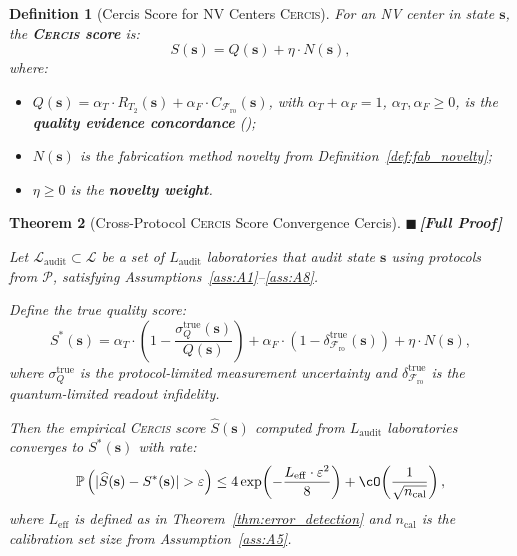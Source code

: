 \documentclass[11pt,a4paper]{article}
\newcommand{\eff}{\mathrm{eff}}
\newtheorem{theorem}{Theorem}[section]
\newtheorem{definition}[theorem]{Definition}
\theoremstyle{definition}
\newcommand{\rigorFull}{{\color{rigorcolor}$\blacksquare$\,\textbf{[Full Proof]}}}
\newcommand{\Cercis}{\textsc{Cercis}}
\newcommand{\Pbb}{\mathbb{P}}
\newcommand{\cL}{\mathcal{L}}
\newcommand{\cP}{\mathcal{P}}
\newcommand{\Ttwo}{T_2}
\newcommand{\NV}{NV}
\newcommand{\FidReadout}{\mathcal{F}_{\text{ro}}}
\begin{document}
\begin{definition}[Cercis Score for NV Centers \Cercis ]
\label{def:cercis}
For an \NV{} center in state $\mathbf{s}$, the \textbf{\Cercis{} score} is:
\begin{equation}
    S(\mathbf{s}) = Q(\mathbf{s}) + \eta \cdot N(\mathbf{s}),
    \label{eq:cercis_def}
\end{equation}
where:
\begin{itemize}[nosep]
    \item $Q(\mathbf{s}) = \alpha_T \cdot R_{\Ttwo}(\mathbf{s}) + \alpha_F \cdot C_{\FidReadout}(\mathbf{s})$,
    with $\alpha_T + \alpha_F = 1$, $\alpha_T, \alpha_F \geq 0$, is the
    \textbf{quality evidence concordance} ();
    \item $N(\mathbf{s})$ is the fabrication method novelty from
    Definition~\ref{def:fab_novelty};
    \item $\eta \geq 0$ is the \textbf{novelty weight}.
\end{itemize}
\end{definition}

\begin{theorem}[Cross-Protocol \Cercis{} Score Convergence Cercis]
\label{thm:cercis_convergence}
\rigorFull

Let $\cL_{\text{audit}} \subset \cL$ be a set of $L_{\text{audit}}$ laboratories
that audit state $\mathbf{s}$ using protocols from $\cP$, satisfying
Assumptions~\ref{ass:A1}--\ref{ass:A8}.

Define the true quality score:
\begin{equation}
    S^*(\mathbf{s}) = \alpha_T \cdot \left(1 - \frac{\sigma_Q^{\text{true}}(\mathbf{s})}{Q(\mathbf{s})}\right)
                   + \alpha_F \cdot \left(1 - \delta_{\FidReadout}^{\text{true}}(\mathbf{s})\right)
                   + \eta \cdot N(\mathbf{s}),
\end{equation}
where $\sigma_Q^{\text{true}}$ is the protocol-limited measurement uncertainty
and $\delta_{\FidReadout}^{\text{true}}$ is the quantum-limited readout infidelity.

Then the empirical \Cercis{} score $\widehat{S}(\mathbf{s})$ computed from
$L_{\text{audit}}$ laboratories converges to $S^*(\mathbf{s})$ with rate:
\begin{equation}
    \Pbb\left(|\widehat{S}(\mathbf{s}) - S^*(\mathbf{s})| > \varepsilon\right)
    \leq 4 \exp\!\left(-\frac{L_{\eff} \cdot \varepsilon^2}{8}\right)
        + \cO\!\left(\frac{1}{\sqrt{n_{\text{cal}}}}\right),
    \label{eq:cercis_convergence}
\end{equation}
where $L_{\eff}$ is defined as in Theorem~\ref{thm:error_detection} and
$n_{\text{cal}}$ is the calibration set size from Assumption~\ref{ass:A5}.
\end{theorem}
\end{document}

